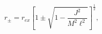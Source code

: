 \begin{equation}
r_{\pm }=r_{ex}\left[1\pm \sqrt{1-\frac{J^{2}}{M^{2}\ell^{2}}}
\right]^{\frac{1}{2}},
\end{equation}

